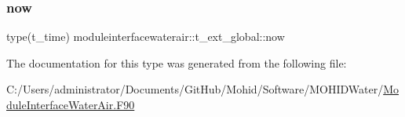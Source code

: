 \mbox{\label{structmoduleinterfacewaterair_1_1t__ext__global_a63338321d3f4705bc08c0178f7dbfa9a}} 
\subsubsection{\texorpdfstring{now}{now}}
{\footnotesize\ttfamily type(t\+\_\+time) moduleinterfacewaterair\+::t\+\_\+ext\+\_\+global\+::now\hspace{0.3cm}{\ttfamily [private]}}



The documentation for this type was generated from the following file\+:\begin{DoxyCompactItemize}
\item 
C\+:/\+Users/administrator/\+Documents/\+Git\+Hub/\+Mohid/\+Software/\+M\+O\+H\+I\+D\+Water/\mbox{\hyperlink{_module_interface_water_air_8_f90}{Module\+Interface\+Water\+Air.\+F90}}\end{DoxyCompactItemize}
